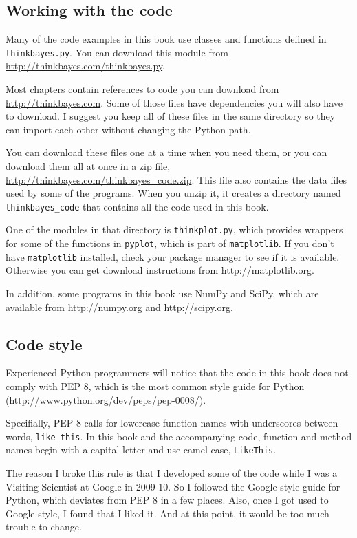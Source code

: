 \documentclass[12pt]{book}
\begin{document}
\subsection*{Working with the code}

Many of the code examples in this book use classes and functions
defined in {\tt thinkbayes.py}.  You can download this module
from \url{http://thinkbayes.com/thinkbayes.py}.

Most chapters contain references to code you can download from
\url{http://thinkbayes.com}.  Some of those files have
dependencies you will also have to download.  I suggest you
keep all of these files in the same directory so they can import
each other without changing the Python path.

You can download these files one at a time when you need them, or you
can download them all at once in a zip file,
\url{http://thinkbayes.com/thinkbayes_code.zip}.  This file also
contains the data files used by some of the programs.  When you unzip
it, it creates a directory named \verb"thinkbayes_code" that contains
all the code used in this book.

One of the modules in that directory is {\tt thinkplot.py},
which provides wrappers for some of the functions in {\tt pyplot},
which is part of {\tt matplotlib}.  If you don't have {\tt matplotlib}
installed, check your package manager to see if it is available.
Otherwise you can get download instructions
from \url{http://matplotlib.org}.

In addition, some programs in this book use NumPy and SciPy, which are
available from \url{http://numpy.org} and \url{http://scipy.org}.


\subsection*{Code style}

Experienced Python programmers will notice that the code in this
book does not comply with PEP 8, which is the most common
style guide for Python (\url{http://www.python.org/dev/peps/pep-0008/}).

Specifially, PEP 8 calls for lowercase function names with
underscores between words, \verb"like_this".  In this book and
the accompanying code, function and method names begin with
a capital letter and use camel case, \verb"LikeThis".

The reason I broke this rule is that I developed some of the code
while I was a Visiting Scientist at Google in 2009-10.  So I followed
the Google style guide for Python, which deviates from PEP 8 in a few
places.  Also, once I got used to Google style, I found that I liked
it.  And at this point, it would be too much trouble to change.
\end{document}
